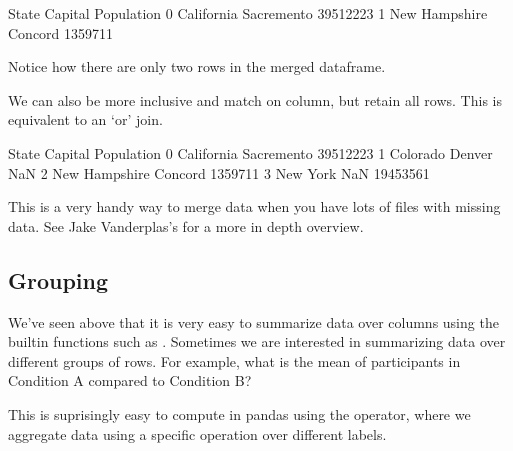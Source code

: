 \documentclass[letterpaper,10pt,english]{sphinxmanual}
\begin{document}
\begin{sphinxVerbatim}[commandchars=\\\{\}]
           State     Capital Population
0     California  Sacremento   39512223
1  New Hampshire     Concord    1359711
\end{sphinxVerbatim}

Notice how there are only two rows in the merged dataframe.

We can also be more inclusive and match on  column, but retain all rows. This is equivalent to an ‘or’ join.

\begin{sphinxVerbatim}[commandchars=\\\{\}]
     
\end{sphinxVerbatim}

\begin{sphinxVerbatim}[commandchars=\\\{\}]
           State     Capital Population
0     California  Sacremento   39512223
1       Colorado      Denver        NaN
2  New Hampshire     Concord    1359711
3       New York         NaN   19453561
\end{sphinxVerbatim}

This is a very handy way to merge data when you have lots of files with missing data.  See Jake Vanderplas’s  for a more in depth overview.


\subsection{Grouping}
\label{\detokenize{content/Introduction_to_Pandas:grouping}}
We’ve seen above that it is very easy to summarize data over columns using the builtin functions such as . Sometimes we are interested in summarizing data over different groups of rows. For example, what is the mean of participants in Condition A compared to Condition B?

This is suprisingly easy to compute in pandas using the  operator, where we aggregate data using a specific operation over different labels.
\end{document}
